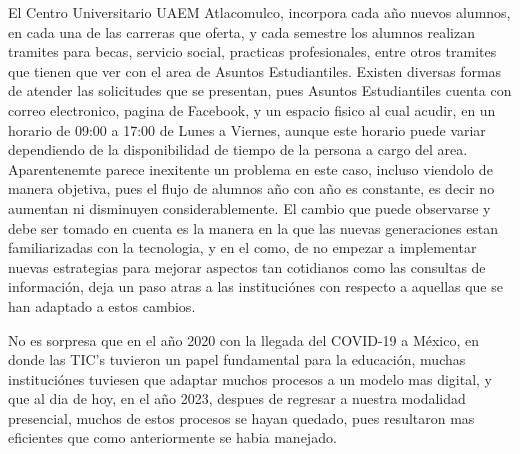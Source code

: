 El Centro Universitario UAEM Atlacomulco, incorpora cada año nuevos alumnos, en cada una de las carreras que oferta, y cada semestre los alumnos realizan tramites para becas, servicio social, practicas profesionales, entre otros tramites que tienen que ver con el area de Asuntos Estudiantiles. Existen diversas formas de atender las solicitudes que se presentan, pues Asuntos Estudiantiles cuenta con correo electronico, pagina de Facebook, y un espacio fisico al cual acudir, en un horario de 09:00 a 17:00 de Lunes a Viernes, aunque este horario puede variar dependiendo de la disponibilidad de tiempo de la persona a cargo del area. Aparentenemte parece inexitente un problema en este caso, incluso viendolo de manera objetiva, pues el flujo de alumnos año con año es constante, es decir no aumentan ni disminuyen considerablemente. El cambio que puede observarse y debe ser tomado en cuenta es la manera en la que las nuevas generaciones estan familiarizadas con la tecnologia, y en el como, de no empezar a implementar nuevas estrategias para mejorar aspectos tan cotidianos como las consultas de información, deja un paso atras a las instituciónes con respecto a aquellas que se han adaptado a estos cambios.

No es sorpresa que en el año 2020 con la llegada del COVID-19 a México, en donde las TIC's tuvieron un papel fundamental para la educación, muchas instituciónes tuviesen que adaptar muchos procesos a un modelo mas digital, y que al dia de hoy, en el año 2023, despues de regresar a nuestra modalidad presencial, muchos de estos procesos se hayan quedado, pues resultaron mas eficientes que como anteriormente se habia manejado.